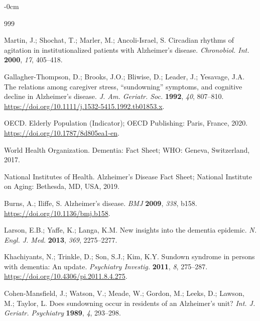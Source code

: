 \documentclass[brainsci,article,submit,moreauthors]{Definitions/mdpi}
\begin{document}


\begin{adjustwidth}{-\extralength}{0cm}


\begin{thebibliography}{999}

Martin, J.; Shochat, T.; Marler, M.; Ancoli-Israel, S. Circadian rhythms of agitation in institutionalized patients with Alzheimer's disease. \textit{Chronobiol. Int.} \textbf{2000}, \textit{17}, 405--418.

Gallagher-Thompson, D.; Brooks, J.O.; Bliwise, D.; Leader, J.; Yesavage, J.A. The relations among caregiver stress, ``sundowning'' symptoms, and cognitive decline in Alzheimer's disease. \textit{J. Am. Geriatr. Soc.} \textbf{1992}, \textit{40}, 807--810. \url{https://doi.org/10.1111/j.1532-5415.1992.tb01853.x}.

OECD. Elderly Population (Indicator); OECD Publishing: Paris, France, 2020. \url{https://doi.org/10.1787/8d805ea1-en}.

World Health Organization. Dementia: Fact Sheet; WHO: Geneva, Switzerland, 2017.

National Institutes of Health. Alzheimer's Disease Fact Sheet; National Institute on Aging: Bethesda, MD, USA, 2019.

Burns, A.; Iliffe, S. Alzheimer's disease. \textit{BMJ} \textbf{2009}, \textit{338}, b158. \url{https://doi.org/10.1136/bmj.b158}.

Larson, E.B.; Yaffe, K.; Langa, K.M. New insights into the dementia epidemic. \textit{N. Engl. J. Med.} \textbf{2013}, \textit{369}, 2275--2277.

Khachiyants, N.; Trinkle, D.; Son, S.J.; Kim, K.Y. Sundown syndrome in persons with dementia: An update. \textit{Psychiatry Investig.} \textbf{2011}, \textit{8}, 275--287. \url{https://doi.org/10.4306/pi.2011.8.4.275}.

Cohen-Mansfield, J.; Watson, V.; Meade, W.; Gordon, M.; Leeks, D.; Lawson, M.; Taylor, L. Does sundowning occur in residents of an Alzheimer's unit? \textit{Int. J. Geriatr. Psychiatry} \textbf{1989}, \textit{4}, 293--298.


\end{thebibliography}
\end{adjustwidth}
\end{document}
